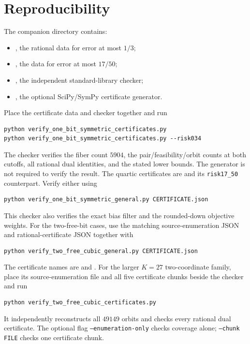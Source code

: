 \documentclass[11pt]{article}
\begin{document}
\section{Reproducibility}
\begingroup\small\sloppy
The companion directory contains:
\begin{itemize}
\item {}, the rational data for error at most $1/3$;
\item {}, the data for error at most $17/50$;
\item {}, the independent standard-library checker;
\item {}, the optional SciPy/SymPy certificate generator.
\end{itemize}
Place the certificate data and checker together and run
\begin{verbatim}
python verify_one_bit_symmetric_certificates.py
python verify_one_bit_symmetric_certificates.py --risk034
\end{verbatim}
The checker verifies the fiber count $5904$, the pair/feasibility/orbit counts at both cutoffs, all rational dual identities, and the stated lower bounds. The generator is not required to verify the result. The quartic certificates are
and its \texttt{risk17\_50} counterpart. Verify either using
\begin{verbatim}
python verify_one_bit_symmetric_general.py CERTIFICATE.json
\end{verbatim}
This checker also verifies the exact bias filter and the rounded-down objective weights. For the two-free-bit cases, use the matching source-enumeration JSON and rational-certificate JSON together with
\begin{verbatim}
python verify_two_free_cubic_general.py CERTIFICATE.json
\end{verbatim}
The certificate names are 
and . For the larger $K=27$ two-coordinate family, place its source-enumeration file and all five certificate chunks beside the checker and run
\begin{verbatim}
python verify_two_free_cubic_certificates.py
\end{verbatim}
It independently reconstructs all $49149$ orbits and checks every rational dual certificate. The optional flag \texttt{--enumeration-only} checks coverage alone; \texttt{--chunk FILE} checks one certificate chunk.
\endgroup
\end{document}
